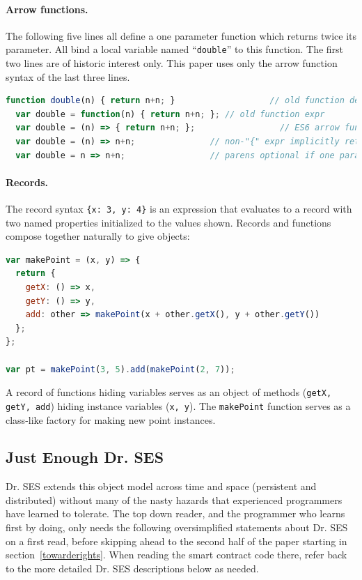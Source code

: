 \documentclass{llncs}
\begin{document}
\paragraph{Arrow functions.} 

The following five lines all define a one parameter function which returns twice its parameter. All bind a local variable named ``{\tt double}'' to this function. The first two lines are of historic interest only. This paper uses only the arrow function syntax of the last three lines.

\begin{lstlisting}[language=JavaScript,numbers=none]
  function double(n) { return n+n; }                   // old function decl
  var double = function(n) { return n+n; }; // old function expr
  var double = (n) => { return n+n; };                 // ES6 arrow function
  var double = (n) => n+n;               // non-"{" expr implicitly returned
  var double = n => n+n;                 // parens optional if one param
\end{lstlisting}

\paragraph{Records.} 

The record syntax {\tt \{x: 3, y: 4\}} is an expression that evaluates to a record with two named properties initialized to the values shown. Records and functions compose together naturally to give objects:

\begin{lstlisting}[language=JavaScript,numbers=none]
var makePoint = (x, y) => {
  return {
    getX: () => x,
    getY: () => y,
    add: other => makePoint(x + other.getX(), y + other.getY())
  };
};

var pt = makePoint(3, 5).add(makePoint(2, 7));
\end{lstlisting}

A record of functions hiding variables serves as an object of methods ({\tt getX, getY, add}) hiding instance variables ({\tt x, y}). The {\tt makePoint} function serves as a class-like factory for making new point instances.

\subsection{Just Enough Dr. SES}
\label{enoughdrses}

Dr. SES extends this object model across time and space (persistent and distributed) without many of the nasty hazards that experienced programmers have learned to tolerate. The top down reader, and the programmer who learns first by doing, only needs the following oversimplified statements about Dr. SES on a first read, before skipping ahead to the second half of the paper starting in section~\ref{towarderights}. When reading the smart contract code there, refer back to the more detailed Dr. SES descriptions below as needed. 
\end{document}
